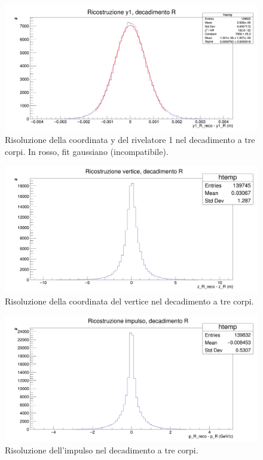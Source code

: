 \documentclass[8pt]{extarticle}
\begin{document}
\begin{figure}[!h]
\begin{center}
\includegraphics[scale=0.25]{reco_y1_R}
\caption{Risoluzione della coordinata y del rivelatore 1 nel decadimento a tre corpi. In rosso, fit gaussiano (incompatibile).}
\label{fig:reco_y1_R}
\end{center}
\end{figure}

\begin{figure}[!h]
\begin{center}
\includegraphics[scale=0.25]{reco_z_R}
\caption{Risoluzione della coordinata del vertice nel decadimento a tre corpi.}
\label{fig:reco_z_R}
\end{center}
\end{figure}

\begin{figure}[!h]
\begin{center}
\includegraphics[scale=0.25]{reco_p_R}
\caption{Risoluzione dell'impulso nel decadimento a tre corpi.}
\label{fig:reco_p_R}
\end{center}
\end{figure}
\end{document}
